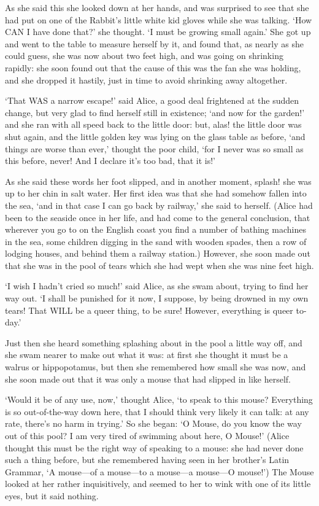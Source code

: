 \documentclass[12pt]{article}
\begin{document}
\begin{Parallel}[p]{}{}
{As she said this she looked down at her hands, and was surprised to see that she had put on one of the Rabbit’s little white kid gloves while she was talking. ‘How CAN I have done that?’ she thought. ‘I must be growing small again.’ She got up and went to the table to measure herself by it, and found that, as nearly as she could guess, she was now about two feet high, and was going on shrinking rapidly: she soon found out that the cause of this was the fan she was holding, and she dropped it hastily, just in time to avoid shrinking away altogether.

‘That WAS a narrow escape!’ said Alice, a good deal frightened at the sudden change, but very glad to find herself still in existence; ‘and now for the garden!’ and she ran with all speed back to the little door: but, alas! the little door was shut again, and the little golden key was lying on the glass table as before, ‘and things are worse than ever,’ thought the poor child, ‘for I never was so small as this before, never! And I declare it’s too bad, that it is!’

As she said these words her foot slipped, and in another moment, splash! she was up to her chin in salt water. Her first idea was that she had somehow fallen into the sea, ‘and in that case I can go back by railway,’ she said to herself. (Alice had been to the seaside once in her life, and had come to the general conclusion, that wherever you go to on the English coast you find a number of bathing machines in the sea, some children digging in the sand with wooden spades, then a row of lodging houses, and behind them a railway station.) However, she soon made out that she was in the pool of tears which she had wept when she was nine feet high.

‘I wish I hadn’t cried so much!’ said Alice, as she swam about, trying to find her way out. ‘I shall be punished for it now, I suppose, by being drowned in my own tears! That WILL be a queer thing, to be sure! However, everything is queer to-day.’

Just then she heard something splashing about in the pool a little way off, and she swam nearer to make out what it was: at first she thought it must be a walrus or hippopotamus, but then she remembered how small she was now, and she soon made out that it was only a mouse that had slipped in like herself.

‘Would it be of any use, now,’ thought Alice, ‘to speak to this mouse? Everything is so out-of-the-way down here, that I should think very likely it can talk: at any rate, there’s no harm in trying.’ So she began: ‘O Mouse, do you know the way out of this pool? I am very tired of swimming about here, O Mouse!’ (Alice thought this must be the right way of speaking to a mouse: she had never done such a thing before, but she remembered having seen in her brother’s Latin Grammar, ‘A mouse—of a mouse—to a mouse—a mouse—O mouse!’) The Mouse looked at her rather inquisitively, and seemed to her to wink with one of its little eyes, but it said nothing.

}
\end{Parallel}
\end{document}
